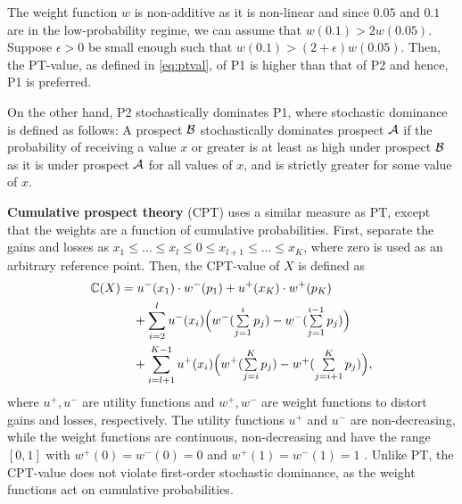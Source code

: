 The weight function $w$ is non-additive as it is non-linear and since $0.05$ and $0.1$ are in the low-probability regime, we can assume that $w(0.1) > 2 w(0.05)$. Suppose $\epsilon>0$ be small enough such that $w(0.1) > (2+\epsilon) w(0.05)$. Then, the PT-value, as defined in \eqref{eq:ptval}, of P1 is higher than that of P2 and hence, P1 is preferred.

On the other hand, P2 stochastically dominates P1, where stochastic dominance is defined as follows:
A prospect ${\cal B}$ stochastically dominates prospect ${\cal A}$ if the probability of receiving a value $x$ or greater is at least as high under prospect ${\cal B}$ as it is under prospect ${\cal A}$  for all values of $x$, and is strictly greater for some value of $x$.
  
  

\textbf{Cumulative prospect theory} (CPT) \cite{tversky1992advances} uses a similar measure as PT, except that the weights are a function of cumulative probabilities. First, separate the gains and losses as 
$x_1\le \ldots \le x_l \le 0 \le x_{l+1} \le \ldots \le x_K$,
where zero is used as an arbitrary reference point.
Then, the CPT-value of $X$ is defined as 
\begin{align*}
\mathbb{C}(X) &= u^-(x_1)\cdot w^-(p_1) + u^+(x_K)\cdot w^+(p_K)\\
&\quad+\sum\limits_{i=2}^l u^-(x_i) \Big(w^-(\textstyle\sum\limits_{j=1}^i p_j) - w^-(\textstyle\sum\limits_{j=1}^{i-1} p_j)\Big)  \\
&\quad 
 + \sum\limits_{i=l+1}^{K-1} u^+(x_i) \Big(w^+(\textstyle\sum\limits_{j=i}^K p_j) - w^+(\textstyle\sum\limits_{j=i+1}^K p_j) \Big), 
\end{align*} 
where $u^+, u^-$ are utility functions and $w^+, w^-$ are weight functions to distort gains and losses, respectively. The utility functions $u^+$ and $u^-$ are non-decreasing, while the weight functions are continuous, non-decreasing and have the range $[0,1]$ with $w^+(0)=w^-(0)=0$ and $w^+(1)=w^-(1)=1$ . 
Unlike PT, the CPT-value does not violate first-order stochastic dominance, as the weight functions act on cumulative probabilities. 

